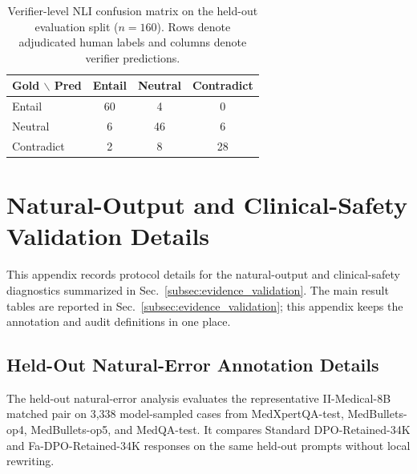 \documentclass[a4paper,fleqn,doubleblind]{cas-sc}
\begin{document}
\begin{table}[!b]
    \centering
    \caption{Verifier-level NLI confusion matrix on the held-out evaluation split ($n=160$). Rows denote adjudicated human labels and columns denote verifier predictions.}
    \label{tab:nli_confusion_template}
    \begin{tabular}{lccc}
        \toprule
        \textbf{Gold $\backslash$ Pred} & \textbf{Entail} & \textbf{Neutral} & \textbf{Contradict} \\
        \midrule
        Entail & 60 & 4 & 0 \\
        Neutral & 6 & 46 & 6 \\
        Contradict & 2 & 8 & 28 \\
        \bottomrule
    \end{tabular}
\end{table}

\section{Natural-Output and Clinical-Safety Validation Details}
\label{app:natural_safety_validation_details}

This appendix records protocol details for the natural-output and clinical-safety diagnostics summarized in Sec.~\ref{subsec:evidence_validation}. The main result tables are reported in Sec.~\ref{subsec:evidence_validation}; this appendix keeps the annotation and audit definitions in one place.

\subsection{Held-Out Natural-Error Annotation Details}
\label{app:heldout_natural_error_details}

The held-out natural-error analysis evaluates the representative II-Medical-8B matched pair on 3,338 model-sampled cases from MedXpertQA-test, MedBullets-op4, MedBullets-op5, and MedQA-test. It compares Standard DPO-Retained-34K and Fa-DPO-Retained-34K responses on the same held-out prompts without local rewriting.
\end{document}
